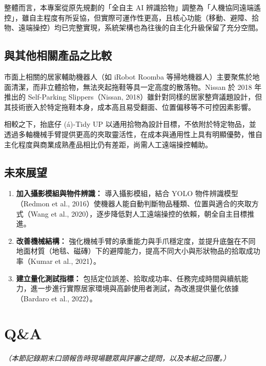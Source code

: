 \documentclass[12pt]{article}
\begin{document}
整體而言，本專案從原先規劃的「全自主 AI 辨識拾物」調整為「人機協同遠端遙控」，雖自主程度有所妥協，但實際可運作性更高，且核心功能（移動、避障、拾物、遠端操控）均已完整實現，系統架構也為往後的自主化升級保留了充分空間。

\subsection{與其他相關產品之比較}

市面上相關的居家輔助機器人（如 iRobot Roomba 等掃地機器人）主要聚焦於地面清潔，而非立體拾物，無法夾起拖鞋等具一定高度的散落物。Nissan 於 2018 年推出的 Self-Parking Slippers（Nissan, 2018）雖針對同樣的居家整齊議題設計，但其技術嵌入於特定拖鞋本身，成本高且易受翻面、位置偏移等不可控因素影響。

相較之下，抬底仔 (á)-Tidy UP 以通用拾物為設計目標，不依附於特定物品，並透過多軸機械手臂提供更高的夾取靈活性，在成本與通用性上具有明顯優勢，惟自主化程度與商業成熟產品相比仍有差距，尚需人工遠端操控輔助。

\subsection{未來展望}

\begin{enumerate}
  \setlength{\itemsep}{0.5em}
  \item \textbf{加入攝影模組與物件辨識：} 導入攝影模組，結合 YOLO 物件辨識模型（Redmon et al., 2016）使機器人能自動判斷物品種類、位置與適合的夾取方式（Wang et al., 2020），逐步降低對人工遠端操控的依賴，朝全自主目標推進。
  \item \textbf{改善機械結構：} 強化機械手臂的承重能力與手爪穩定度，並提升底盤在不同地面材質（地毯、磁磚）下的避障能力，提高不同大小與形狀物品的拾取成功率（Kumar et al., 2021）。
  \item \textbf{建立量化測試指標：} 包括定位誤差、拾取成功率、任務完成時間與續航能力，進一步進行實際居家環境與高齡使用者測試，為改進提供量化依據（Bardaro et al., 2022）。
\end{enumerate}

\section{Q\&A}

\textit{（本節記錄期末口頭報告時現場聽眾與評審之提問，以及本組之回覆。）}
\end{document}
